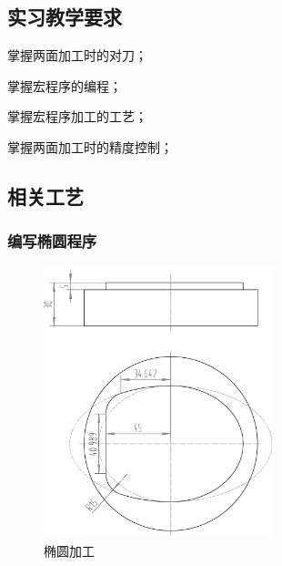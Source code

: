 \jxhj{%
	}

\makeshouye %

\subsection{实习教学要求}
\begin{compactenum}[\hspace{2em}1、]
	\item 掌握两面加工时的对刀；
	\item 掌握宏程序的编程；
	\item 掌握宏程序加工的工艺；
	\item 掌握两面加工时的精度控制；
\end{compactenum}

\subsection{相关工艺}
\subsubsection{编写椭圆程序}
\begin{figure}[!hbtp]
	\centering	\includegraphics[width=0.6\textwidth]{images/shixi_1-1}
	\caption{椭圆加工} \label{椭圆加工}
\end{figure}

